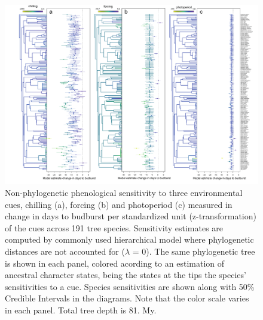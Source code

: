 \documentclass[11pt]{article}
\begin{document}
\begin{figure} [H]
  \begin{center}
  \includegraphics[width=16cm]{../../analyses/phylogeny/figures/FigSXX_ phylo_muplots191_lamb0.pdf}
  \caption{Non-phylogenetic phenological sensitivity to three environmental cues, chilling (a), forcing (b) and photoperiod (c) measured in change in days to budburst per standardized unit (z-transformation) of the cues across 191 tree species. Sensitivity estimates are computed by commonly used hierarchical model where phylogenetic distances are not accounted for ($\lambda$ = 0). The same phylogenetic tree is shown in each panel, colored acording to an estimation of ancestral character states, being the states at the tips the species' sensitivities to a cue. Species sensitivities are shown along with 50\% Credible Intervals in the diagrams. Note that the color scale varies in each panel. Total tree depth is 81. My.}
  \label{fig:muplot_all}
  \end{center}
\end{figure}
\end{document}
